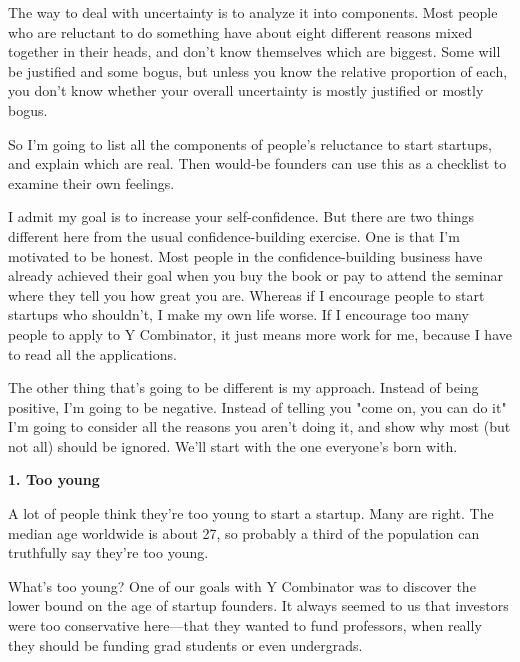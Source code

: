 The way to deal with
                    uncertainty is to analyze it into components. Most people
                    who are reluctant to do something have about eight different
                    reasons mixed together in their heads, and don't know
                    themselves which are biggest. Some will be justified and
                    some bogus, but unless you know the relative proportion of
                    each, you don't know whether your overall uncertainty is
                    mostly justified or mostly bogus.

So I'm going to
                    list all the components of people's reluctance to start
                    startups, and explain which are real. Then would-be founders
                    can use this as a checklist to examine their own
                    feelings.

I admit my goal is to increase your
                    self-confidence. But there are two things different here
                    from the usual confidence-building exercise. One is that I'm
                    motivated to be honest. Most people in the
                    confidence-building business have already achieved their
                    goal when you buy the book or pay to attend the seminar
                    where they tell you how great you are. Whereas if I
                    encourage people to start startups who shouldn't, I make my
                    own life worse. If I encourage too many people to apply to Y
                    Combinator, it just means more work for me, because I have
                    to read all the applications.

The other thing
                    that's going to be different is my approach. Instead of
                    being positive, I'm going to be negative. Instead of telling
                    you "come on, you can do it" I'm going to consider all the
                    reasons you aren't doing it, and show why most (but not all)
                    should be ignored. We'll start with the one everyone's born
                    with.

\textbf{1. Too young}

A lot of
                    people think they're too young to start a startup. Many are
                    right. The median age worldwide is about 27, so probably a
                    third of the population can truthfully say they're too
                    young.

What's too young? One of our goals with Y
                    Combinator was to discover the lower bound on the age of
                    startup founders. It always seemed to us that investors were
                    too conservative here---that they wanted to fund
                    professors, when really they should be funding grad students
                    or even undergrads.

